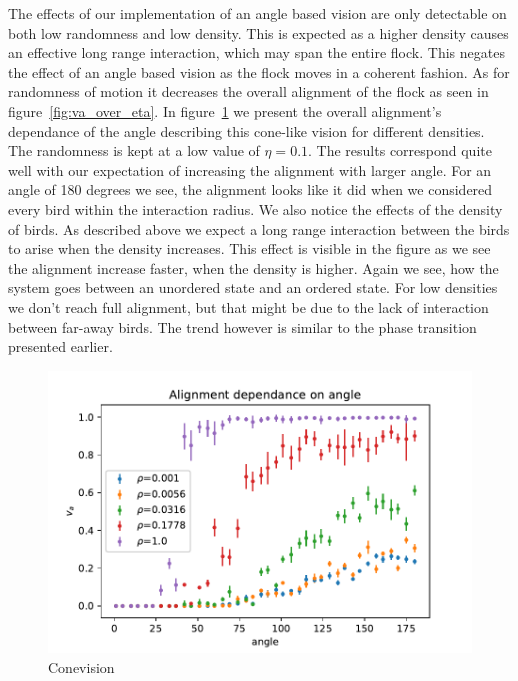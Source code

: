 \documentclass[twoside,twocolumn]{article}
\begin{document}
The effects of our implementation of an angle based vision are only detectable on both low randomness and low density.
This is expected as a higher density causes an effective long range interaction, which may span the entire flock.
This negates the effect of an angle based vision as the flock moves in a coherent fashion.
As for randomness of motion it decreases the overall alignment of the flock as seen in figure~\ref{fig:va_over_eta}.
In figure~\ref{fig:conevision} we present the overall alignment's dependance of the angle describing this cone-like
vision for different densities. The randomness is kept at a low value of $\eta=0.1$.
The results correspond quite well with our expectation of increasing the alignment with larger angle.
For an angle of 180 degrees we see, the alignment looks like it did when we considered every bird within the interaction radius.
We also notice the effects of the density of birds. As described above we expect a long range interaction
between the birds to arise when the density increases.
This effect is visible in the figure as we see the alignment increase faster, when the density is higher.
Again we see, how the system goes between an unordered state and an ordered state. For low densities we don't reach full alignment, but that might be due to the lack of interaction between far-away birds. The trend however is similar to the phase transition presented earlier.

\begin{figure}[!htb]
\begin{center}
\includegraphics[width=\columnwidth]{va_over_angle}
\end{center}
\caption{Conevision}\label{fig:conevision}
\end{figure}
\end{document}
